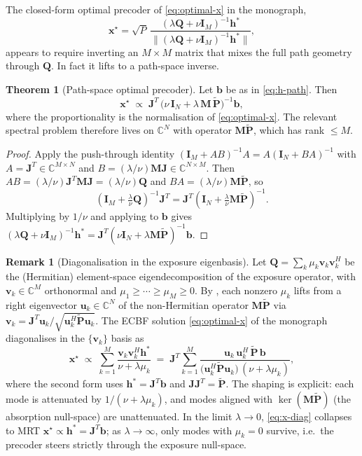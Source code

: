 \documentclass[11pt,a4paper]{article}
\theoremstyle{definition}
\newtheorem{theorem}{Theorem}[section]
\newtheorem{remark}[remark]{Remark}
\newcommand{\Complex}{\mathbb{C}}
\newcommand{\Jmat}{\mathbf{J}}                 %
\newcommand{\Mmat}{\mathbf{M}}                 %
\newcommand{\Qmat}{\mathbf{Q}}                 %
\newcommand{\Pmat}{\tilde{\mathbf{P}}}         %
\newcommand{\xx}{\mathbf{x}}
\newcommand{\hh}{\mathbf{h}}
\newcommand{\bvec}{\mathbf{b}}
\newcommand{\Id}{\mathbf{I}}
\newcommand{\vv}{\mathbf{v}}
\newcommand{\uu}{\mathbf{u}}
\begin{document}
The closed-form optimal precoder of \cref{eq:optimal-x} in the monograph,
\[
  \xx^\star=\sqrt P\,\frac{(\lambda\Qmat+\nu\Id_M)^{-1}\hh^*}
  {\|(\lambda\Qmat+\nu\Id_M)^{-1}\hh^*\|},
\]
appears to require inverting an $M\times M$ matrix that mixes the full
path geometry through $\Qmat$.  In fact it lifts to a path-space inverse.

\begin{theorem}[Path-space optimal precoder]\label{thm:x-path}
Let $\bvec$ be as in \eqref{eq:h-path}.  Then
\begin{equation}\label{eq:x-path}
  \boxed{\;
  \xx^\star\;\propto\;\Jmat^T\,\bigl(\nu\,\Id_N+\lambda\,\Mmat\,\Pmat\bigr)^{-1}\bvec,
  \;}
\end{equation}
where the proportionality is the normalisation of \cref{eq:optimal-x}.
The relevant spectral problem therefore lives on $\Complex^N$
with operator $\Mmat\Pmat$, which has rank $\le M$.
\end{theorem}

\begin{proof}
Apply the push-through identity $(\Id_M+AB)^{-1}A=A(\Id_N+BA)^{-1}$ with
$A=\Jmat^T\in\Complex^{M\times N}$ and
$B=(\lambda/\nu)\Mmat\Jmat\in\Complex^{N\times M}$.  Then
$AB=(\lambda/\nu)\Jmat^T\Mmat\Jmat=(\lambda/\nu)\Qmat$ and
$BA=(\lambda/\nu)\Mmat\Pmat$, so
\[
  (\Id_M+\tfrac{\lambda}{\nu}\Qmat)^{-1}\Jmat^T
  =\Jmat^T(\Id_N+\tfrac{\lambda}{\nu}\Mmat\Pmat)^{-1}.
\]
Multiplying by $1/\nu$ and applying to $\bvec$ gives
$(\lambda\Qmat+\nu\Id_M)^{-1}\hh^*
=\Jmat^T(\nu\Id_N+\lambda\Mmat\Pmat)^{-1}\bvec$.
\end{proof}

\begin{remark}[Diagonalisation in the exposure eigenbasis]%
\label{rem:diag-M}
Let $\Qmat=\sum_k\mu_k\vv_k\vv_k^H$ be the (Hermitian) element-space
eigendecomposition of the exposure operator, with $\vv_k\in\Complex^M$
orthonormal and $\mu_1\ge\cdots\ge\mu_M\ge 0$.  By ,
each nonzero $\mu_k$ lifts from a right eigenvector $\uu_k\in\Complex^N$
of the non-Hermitian operator $\Mmat\Pmat$ via
$\vv_k=\Jmat^T\uu_k/\sqrt{\uu_k^H\Pmat\uu_k}$.  The ECBF solution
\cref{eq:optimal-x} of the monograph diagonalises in the $\{\vv_k\}$ basis
as
\begin{equation}\label{eq:x-diag}
  \xx^\star\;\propto\;\sum_{k=1}^{M}\frac{\vv_k\vv_k^H\hh^*}{\nu+\lambda\mu_k}
  \;=\;\Jmat^T\sum_{k=1}^{M}\frac{\uu_k\,\uu_k^H\,\Pmat\,\bvec}
  {\bigl(\uu_k^H\Pmat\uu_k\bigr)\,(\nu+\lambda\mu_k)},
\end{equation}
where the second form uses $\hh^*=\Jmat^T\bvec$ and
$\Jmat\Jmat^T=\Pmat$.  The shaping is explicit: each mode is
attenuated by $1/(\nu+\lambda\mu_k)$, and modes aligned with
$\ker(\Mmat\Pmat)$ (the absorption null-space) are unattenuated.  In the
limit $\lambda\to 0$, \eqref{eq:x-diag} collapses to MRT
$\xx^\star\propto\hh^*=\Jmat^T\bvec$; as $\lambda\to\infty$, only modes
with $\mu_k=0$ survive, i.e.\ the precoder steers strictly through the
exposure null-space.
\end{remark}
\end{document}
